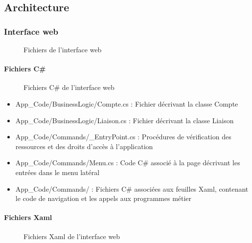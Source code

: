 \documentclass[a4paper,french,8pt]{article}
\begin{document}
	\subsection{Architecture}
	
		\subsubsection{Interface web}
		
			\begin{figure}[h!]
			\caption{Fichiers de l'interface web}
			\centering
			\end{figure} 
			
				\paragraph{Fichiers C\#}
				
					\begin{figure}[h!]
					  \caption{Fichiers C\# de l'interface web}
					  \centering
					\end{figure} 
					
					\begin{itemize}
						\item App\_Code/BusinessLogic/Compte.cs : Fichier décrivant la classe Compte
						\item App\_Code/BusinessLogic/Liaison.cs : Fichier décrivant la classe Liaison
						\item App\_Code/Commands/\_EntryPoint.cs : Procédures de vérification des ressources et des droits d’accès à l’application
						\item App\_Code/Commands/Menu.cs	: Code C\# associé à la page décrivant les entrées dans le menu latéral
						\item App\_Code/Commands/\* : Fichiers C\# associées aux feuilles Xaml, contenant le code de navigation et les appels aux programmes métier
					\end{itemize}

				\paragraph{Fichiers Xaml}
				      \begin{figure}[h!]
					\caption{Fichiers Xaml de l'interface web}
					\centering
					\end{figure} 
					
\end{document}
